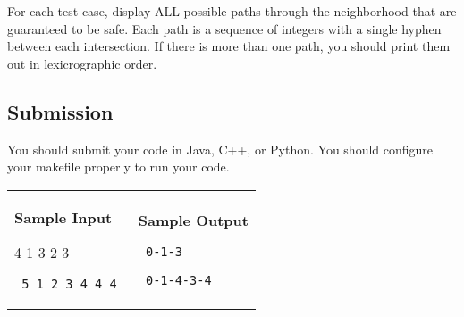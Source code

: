 \documentclass[11pt]{article}
\begin{document}
For each test case, display ALL possible paths through the neighborhood that are guaranteed to be safe. Each path is a sequence of integers with a single hyphen between each intersection. If there is more than one path, you should print them out in lexicrographic order.

\subsection*{Submission}

You should submit your code in Java, C++, or Python. You should configure your makefile properly to run your code.


\vspace{0.25in}\hspace{-0.3in}\begin{tabular}{ll}

\parbox{3in}{{\large\bf Sample Input}

\vspace{0.15in}

{\tt 

4 1 3 2 3\linebreak

}

{\tt
5 1 2 3 4 4 4
}
}

&

\parbox{3in}{{\large\bf Sample Output}

\vspace{0.15in}

{\tt
0-1-3\linebreak
}

{\tt
0-1-4-3-4\linebreak
}
}

\\
\end{tabular}
\end{document}
